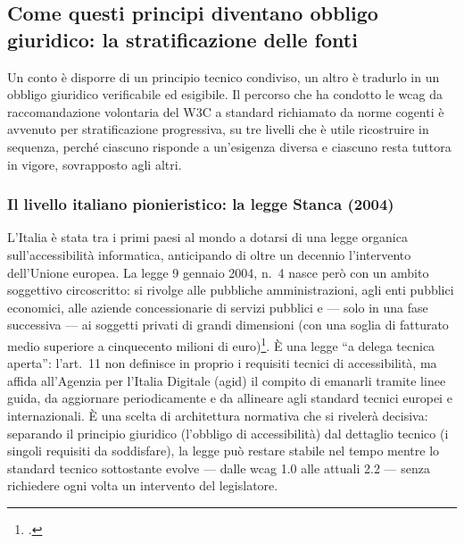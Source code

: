 \subsection{Come questi principi diventano obbligo giuridico: la stratificazione delle fonti}
\label{subsec:stratificazione-fonti}

Un conto è disporre di un principio tecnico condiviso, un altro è tradurlo in un obbligo giuridico verificabile ed esigibile. Il percorso che ha condotto le \gls{wcag} da raccomandazione volontaria del W3C a standard richiamato da norme cogenti è avvenuto per stratificazione progressiva, su tre livelli che è utile ricostruire in sequenza, perché ciascuno risponde a un'esigenza diversa e ciascuno resta tuttora in vigore, sovrapposto agli altri.

\subsubsection{Il livello italiano pionieristico: la legge Stanca (2004)}

L'Italia è stata tra i primi paesi al mondo a dotarsi di una legge organica sull'accessibilità informatica, anticipando di oltre un decennio l'intervento dell'Unione europea. La legge 9 gennaio 2004, n.~4 nasce però con un ambito soggettivo circoscritto: si rivolge alle pubbliche amministrazioni, agli enti pubblici economici, alle aziende concessionarie di servizi pubblici e --- solo in una fase successiva --- ai soggetti privati di grandi dimensioni (con una soglia di fatturato medio superiore a cinquecento milioni di euro)\footcite[art.~3, commi~1 e 1-bis]{legge:stanca}. È una legge \enquote{a delega tecnica aperta}: l'art.~11 non definisce in proprio i requisiti tecnici di accessibilità, ma affida all'Agenzia per l'Italia Digitale (\gls{agid}) il compito di emanarli tramite linee guida, da aggiornare periodicamente e da allineare agli standard tecnici europei e internazionali. È una scelta di architettura normativa che si rivelerà decisiva: separando il principio giuridico (l'obbligo di accessibilità) dal dettaglio tecnico (i singoli requisiti da soddisfare), la legge può restare stabile nel tempo mentre lo standard tecnico sottostante evolve --- dalle \gls{wcag} 1.0 alle attuali 2.2 --- senza richiedere ogni volta un intervento del legislatore.


